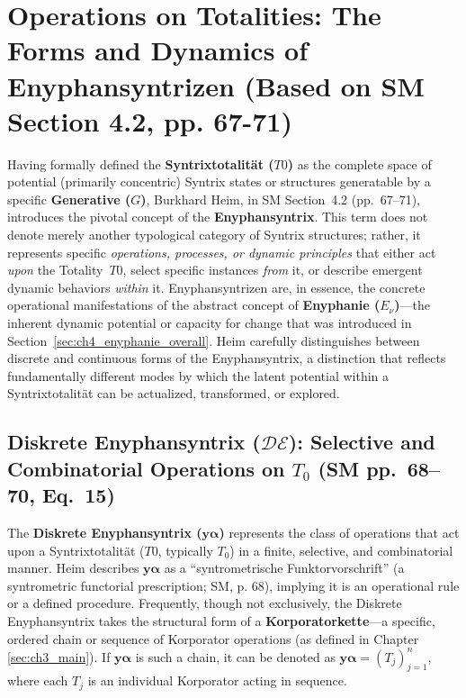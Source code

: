 \documentclass[
    12pt,              %
    a4paper,           %
    headings=normal,   %
    twoside=true,      %
    BCOR=8mm,          %
]{scrbook}
\newcommand{\q}[1]{\enquote{#1}}
\newcommand{\syntrixtotalitaet}{T0}
\newcommand{\generative}{G}
\newcommand{\diskreteEnyphansyntrix}{\bm{y\alpha}}
\begin{document}
\section{Operations on Totalities: The Forms and Dynamics of Enyphansyntrizen (Based on SM Section 4.2, pp. 67-71)}
\label{sec:ch4_enyphansyntrix_operations}

Having formally defined the \textbf{Syntrixtotalität (\(\syntrixtotalitaet\))} as the complete space of potential (primarily concentric) Syntrix states or structures generatable by a specific \textbf{Generative (\(\generative\))}, Burkhard Heim, in SM Section~4.2 (pp.~67--71), introduces the pivotal concept of the \textbf{Enyphansyntrix}. This term does not denote merely another typological category of Syntrix structures; rather, it represents specific \emph{operations, processes, or dynamic principles} that either act \emph{upon} the Totality~\(\syntrixtotalitaet\), select specific instances \emph{from} it, or describe emergent dynamic behaviors \emph{within} it. Enyphansyntrizen are, in essence, the concrete operational manifestations of the abstract concept of \textbf{Enyphanie (\(E_\nu\))}---the inherent dynamic potential or capacity for change that was introduced in Section~\ref{sec:ch4_enyphanie_overall}. Heim carefully distinguishes between discrete and continuous forms of the Enyphansyntrix, a distinction that reflects fundamentally different modes by which the latent potential within a Syntrixtotalität can be actualized, transformed, or explored.

\subsection{Diskrete Enyphansyntrix (\(\mathcal{DE}\)): Selective and Combinatorial Operations on \(T_0\) (SM pp.~68--70, Eq.~15)}
\label{sec:ch4_diskrete_enyphansyntrix_revised}

The \textbf{Diskrete Enyphansyntrix (\(\diskreteEnyphansyntrix\))} represents the class of operations that act upon a Syntrixtotalität (\(\syntrixtotalitaet\), typically \(T_0\)) in a finite, selective, and combinatorial manner. Heim describes \(\diskreteEnyphansyntrix\) as a \q{syntrometrische Funktorvorschrift} (a syntrometric functorial prescription; SM, p. 68), implying it is an operational rule or a defined procedure. Frequently, though not exclusively, the Diskrete Enyphansyntrix takes the structural form of a \textbf{Korporatorkette}—a specific, ordered chain or sequence of Korporator operations (as defined in Chapter \ref{sec:ch3_main}). If \(\diskreteEnyphansyntrix\) is such a chain, it can be denoted as \(\diskreteEnyphansyntrix = (T_j)^n_{j=1}\), where each \(T_j\) is an individual Korporator acting in sequence.
\end{document}
